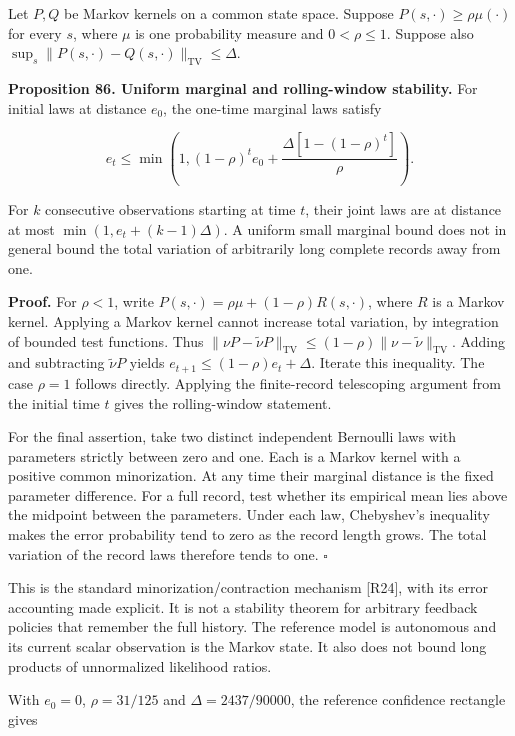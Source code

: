 \documentclass[11pt,letterpaper]{article}
\begin{document}
Let \(P,Q\) be Markov kernels on a common state space. Suppose
\(P(s,\cdot)\geq\rho\mu(\cdot)\) for every \(s\), where \(\mu\) is one
probability measure and \(0<\rho\leq1\). Suppose also
\(\sup_s\|P(s,\cdot)-Q(s,\cdot)\|_{\mathrm{TV}}\leq\Delta\).

\textbf{Proposition 86. Uniform marginal and rolling-window stability.}
For initial laws at distance \(e_0\), the one-time marginal laws satisfy

\[
\boxed{
e_t\leq\min\left(1,
(1-\rho)^te_0+
\frac{\Delta[1-(1-\rho)^t]}{\rho}\right).
}
\]

For \(k\) consecutive observations starting at time \(t\), their joint
laws are at distance at most \(\min(1,e_t+(k-1)\Delta)\). A uniform
small marginal bound does not in general bound the total variation of
arbitrarily long complete records away from one.

\textbf{Proof.} For \(\rho<1\), write
\(P(s,\cdot)=\rho\mu+(1-\rho)R(s,\cdot)\), where \(R\) is a Markov
kernel. Applying a Markov kernel cannot increase total variation, by
integration of bounded test functions. Thus
\(\|\nu P-\widetilde\nu P\|_{\mathrm{TV}}\leq(1-\rho)\|\nu-\widetilde\nu\|_{\mathrm{TV}}\).
Adding and subtracting \(\widetilde\nu P\) yields
\(e_{t+1}\leq(1-\rho)e_t+\Delta\). Iterate this inequality. The case
\(\rho=1\) follows directly. Applying the finite-record telescoping
argument from the initial time \(t\) gives the rolling-window statement.

For the final assertion, take two distinct independent Bernoulli laws
with parameters strictly between zero and one. Each is a Markov kernel
with a positive common minorization. At any time their marginal distance
is the fixed parameter difference. For a full record, test whether its
empirical mean lies above the midpoint between the parameters. Under
each law, Chebyshev's inequality makes the error probability tend to
zero as the record length grows. The total variation of the record laws
therefore tends to one. \(\square\)

This is the standard minorization/contraction mechanism {[}R24{]}, with
its error accounting made explicit. It is not a stability theorem for
arbitrary feedback policies that remember the full history. The
reference model is autonomous and its current scalar observation is the
Markov state. It also does not bound long products of unnormalized
likelihood ratios.

With \(e_0=0\), \(\rho=31/125\) and \(\Delta=2437/90000\), the reference
confidence rectangle gives
\end{document}
